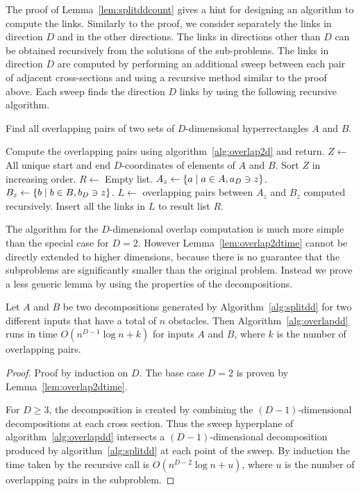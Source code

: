 \documentclass[english,gradu]{tktltiki2018}
\begin{document}
The proof of Lemma~\ref{lem:splitddcount} gives a hint for designing an algorithm to compute the links.
Similarly to the proof, we consider separately the links in direction $D$ and in the other directions.
The links in directions other than $D$ can be obtained recursively from the solutions of the sub-problems.
The links in direction $D$ are computed by performing an additional sweep between each pair of adjacent cross-sections and using a recursive method similar to the proof above.
Each sweep finds the direction $D$ links by using the following recursive algorithm.

\begin{alg}\label{alg:overlapdd}
Find all overlapping pairs of two sets of $D$-dimensional hyperrectangles $A$ and $B$.
\begin{algorithmic}
	\State Compute the overlapping pairs using algorithm~\ref{alg:overlap2d} and return.
\EndIf
\State $Z\gets$ All unique start and end $D$-coordinates of elements of $A$ and $B$.
\State Sort $Z$ in increasing order.
\State $R\gets$ Empty list.
	\State $A_z\gets\left\{a \mid a\in A, a_D\ni z\right\}$.
	\State $B_z\gets\left\{b \mid b\in B, b_D\ni z\right\}$.
	\State $L\gets$ overlapping pairs between $A_z$ and $B_z$ computed recursively.
	\State Insert all the links in $L$ to result list $R$.
\EndFor
\end{algorithmic}
\end{alg}

The algorithm for the $D$-dimensional overlap computation is much more simple than the special case for $D=2$.
However Lemma~\ref{lem:overlap2dtime} cannot be directly extended to higher dimensions, because there is no guarantee that the subproblems are significantly smaller than the original problem.
Instead we prove a less generic lemma by using the properties of the decompositions.

\begin{lem}\label{lem:overlapddtime}
Let $A$ and $B$ be two decompositions generated by Algorithm~\ref{alg:splitdd} for two different inputs that have a total of $n$ obstacles.
Then Algorithm~\ref{alg:overlapdd} runs in time $O(n^{D-1}\log n + k)$ for inputs $A$ and $B$, where $k$ is the number of overlapping pairs.
\end{lem}
\begin{proof}
Proof by induction on $D$.
The base case $D=2$ is proven by Lemma~\ref{lem:overlap2dtime}.

For $D\ge 3$, the decomposition is created by combining the $(D-1)$-dimensional decompositions at each cross section.
Thus the sweep hyperplane of algorithm~\ref{alg:overlapdd} intersects a $(D-1)$-dimensional decomposition produced by algorithm~\ref{alg:splitdd} at each point of the sweep.
By induction the time taken by the recursive call is $O(n^{D-2}\log n + u)$, where $u$ is the number of overlapping pairs in the subproblem.

\end{proof}
\end{document}
